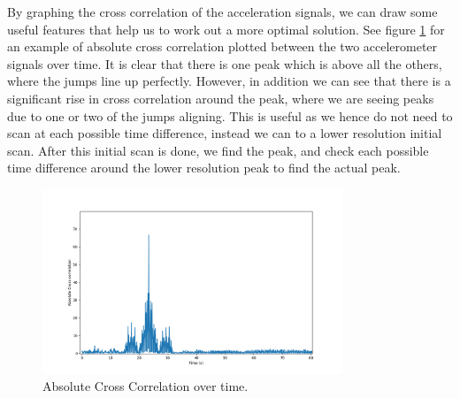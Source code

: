 \documentclass[12pt,a4paper,twoside,openright]{report}
\begin{document}
By graphing the cross correlation of the acceleration signals, we can draw
some useful features that help us to work out a more optimal solution. See
figure \ref{fig:cross-correlation} for an example of absolute cross correlation plotted
between the two accelerometer signals over time. It is clear that there is one
peak which is above all the others, where the jumps line up perfectly.
However, in addition we can see that there is a significant rise in cross
correlation around the peak, where we are seeing peaks due to one or two of
the jumps aligning. This is useful as we hence do not need to scan at each
possible time difference, instead we can to a lower resolution initial scan.
After this initial scan is done, we find the peak, and check each possible
time difference around the lower resolution peak to find the actual peak.

\begin{figure}[h!]
	\centerline{\includegraphics[width=0.8\textwidth]{figs/cross-correlation.png}}
	\caption{Absolute Cross Correlation over time. }
	\label{fig:cross-correlation}
\end{figure}
\end{document}
